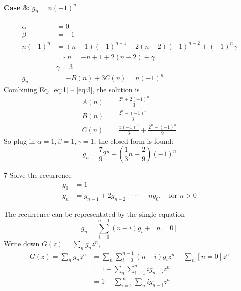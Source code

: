 \documentclass[a4paper,12pt]{article}
\makeatletter
\newtheorem*{solution}{Solution}
\theoremstyle{definition}
\renewenvironment{solution}[1][Solution] {\par\pushQED{\qed}\normalfont\topsep6\p@\@plus6\p@\relax\trivlist\item[\hskip\labelsep\bfseries#1\@addpunct{.}]\ignorespaces}{\popQED\endtrivlist\@endpefalse} \makeatother
\newenvironment{problems}{\begin{list}{}{\renewcommand{\makelabel}[1]{\textbf{##1}\hfil}}}{\end{list}}
\makeatother
\begin{document}
\begin{problems}
\begin{solution}
        \paragraph{Case 3: $g_n = n(-1)^n$}
        \begin{align}
            \alpha &= 0 \nonumber\\
            \beta &= -1  \nonumber\\
            n(-1)^n &= (n-1)(-1)^{n-1} + 2(n-2)(-1)^{n-2} + (-1)^n\gamma  \nonumber\\&\Rightarrow n = -n + 1 + 2(n-2) + \gamma  \nonumber\\ &\gamma = 3 \nonumber\\
            g_n &= - B(n)  + 3C(n)= n(-1)^n \label{eq:3} 
        \end{align}
        Combining Eq. \eqref{eq:1} -- \eqref{eq:3}, the solution is
        \begin{align*}
            A(n) &= \frac{2^n + 2(-1)^n}{3}\\
            B(n) &= \frac{2^n - (-1)^n}{3}\\
            C(n) &= \frac{n(-1)^n}{3} + \frac{2^n-(-1)^n}{9}
        \end{align*}
        So plug in $\alpha = 1,\beta = 1, \gamma = 1$, the closed form is found:
        \begin{equation*}
            g_n = \frac{7}{9}2^n + \left(\frac{1}{3}n + \frac{2}{9}\right)(-1)^n
        \end{equation*}
    \end{solution} 
    \item[7]  Solve the recurrence 
    \begin{align*}
        g_0&=1\\
        g_n&=g_{n-1}+2g_{n-2}+\cdots+ng_0,\quad \text{for }n > 0
    \end{align*}
    \begin{solution}
        The recurrence can be representated by the single equation
        \begin{equation*}
            g_n = \sum_{i=0}^{n-1} (n-i)g_i + [n=0]
        \end{equation*}
        Write down $G(z) =\sum_{n} g_n z^n$,
        \begin{align*}
            G(z) = \sum_{n} g_n z^n &= \sum_n \sum_{i=0}^{n-1} (n-i)g_iz^n + \sum_n [n=0] z^n\\
            &= 1 + \sum_n \sum_{i=1}^n ig_{n-i}z^n\\
            &= 1 + \sum_{i=1}^\infty \sum_n ig_{n-i}z^n\\

\end{align*}
\end{solution}
\end{problems}
\end{document}
